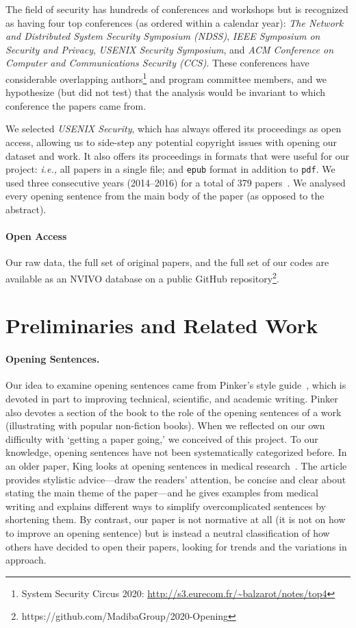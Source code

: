 \documentclass[sigconf]{acmart}
\newcommand{\ie}{\textit{i.e.,}\xspace}
\begin{document}
The field of security has hundreds of conferences and workshops but is recognized as having four top conferences (as ordered within a calendar year): \textit{The Network and Distributed System Security Symposium (NDSS)}, \textit{IEEE Symposium on Security and Privacy}, \textit{USENIX Security Symposium}, and \textit{ACM Conference on Computer and Communications Security (CCS)}. These conferences have considerable overlapping authors\footnote{System Security Circus 2020: \url{http://s3.eurecom.fr/~balzarot/notes/top4}} and program committee members, and we hypothesize (but did not test) that the analysis would be invariant to which conference the papers came from.

We selected \textit{USENIX Security}, which has always offered its proceedings as open access, allowing us to side-step any potential copyright issues with opening our dataset and work. It also offers its proceedings in formats that were useful for our project: \ie all papers in a single file; and \texttt{epub} format in addition to \texttt{pdf}. We used three consecutive years (2014--2016) for a total of 379 papers~\cite{usenix14,usenix15,usenix16}. We analysed every opening sentence from the main body of the paper (as opposed to the abstract).

	\paragraph{Open Access} Our raw data, the full set of original papers, and the full set of our codes are available as an NVIVO database on a public GitHub repository\footnote{https://github.com/MadibaGroup/2020-Opening}.

\section{Preliminaries and Related Work}

\paragraph{Opening Sentences.}

Our idea to examine opening sentences came from Pinker's style guide~\cite{Pin15}, which is devoted in part to improving technical, scientific, and academic writing. Pinker also devotes a section of the book to the role of the opening sentences of a work (illustrating with popular non-fiction books). When we reflected on our own difficulty with `getting a paper going,' we conceived of this project. To our knowledge, opening sentences have not been systematically categorized before. In an older paper, King looks at opening sentences in medical research~\cite{king1967opening}. The article provides stylistic advice---draw the readers' attention, be concise and clear about stating the main theme of the paper---and he gives examples from medical writing and explains different ways to simplify overcomplicated sentences by shortening them. By contrast, our paper is not normative at all (it is not on how to improve an opening sentence) but is instead a neutral classification of how others have decided to open their papers, looking for trends and the variations in approach.
\end{document}
